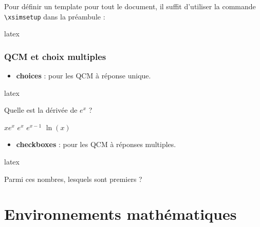 \documentclass[
    french,
    margin=2cm
]{neoschool}
\begin{document}
Pour définir un template pour tout le document, il suffit d'utiliser la commande \texttt{\textbackslash xsimsetup} dans la préambule :

\begin{code}{latex}
\end{code}

\subsubsection{QCM et choix multiples}

\begin{itemize}
\item \textbf{choices} : pour les QCM à réponse unique.
\end{itemize}

\begin{code}{latex}
\begin{exercise}[points=2,ID=qcm01]
    Quelle est la dérivée de $e^x$ ?
    \begin{choices}
        \choice $x e^x$
        \choice[\correct] $e^x$
        \choice $e^{x-1}$
        \choice $\ln(x)$
    \end{choices}
\end{exercise}
\end{code}

\begin{itemize}

\item
  \textbf{checkboxes} : pour les QCM à réponses multiples.
\end{itemize}

\begin{code}{latex}
\begin{exercise}[points=3,ID=qcm02]
    Parmi ces nombres, lesquels sont premiers ?
    \begin{checkboxes}
    \end{checkboxes}
\end{exercise}
\end{code}

\section{Environnements mathématiques}
\end{document}
